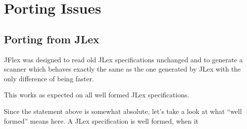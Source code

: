 \documentclass[11pt]{scrartcl}
\begin{document}
\section{Porting Issues}

\subsection{Porting from JLex\label{Porting}}
JFlex was designed to read old JLex specifications unchanged and to
generate a scanner which behaves exactly the same as the one generated
by JLex with the only difference of being faster.

This works as expected on all well formed JLex specifications.

Since the statement above is somewhat absolute, let's take a look at
what ``well formed'' means here. A JLex specification is well formed, when
it
\end{document}
